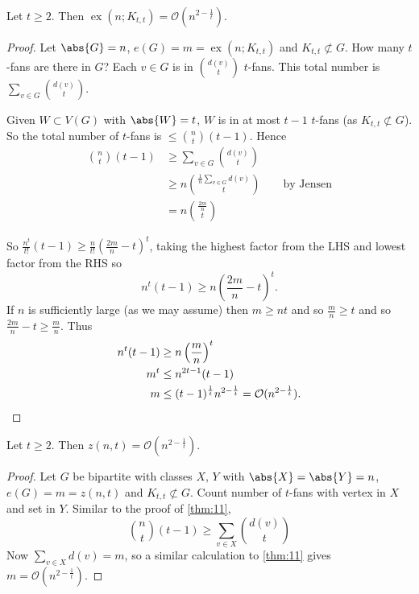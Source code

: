 \documentclass{article}
\DeclareMathOperator{\ext}{ex}
\begin{document}
\begin{nthm}\label{thm:11}
    Let $t \geq 2$.
    Then $\ext(n; K_{t,t}) = \mathcal{O}(n^{2 - \frac{1}{t}})$.
\end{nthm}
\begin{proof}
    Let $\abs{G} = n$, $e(G) = m = \ext(n; K_{t, t})$ and $K_{t,t} \not\subset G$.
    How many $t$-fans are there in $G$?
    Each $v \in G$ is in $\binom{d(v)}{t}$ $t$-fans.
    This total number is $\sum_{v \in G} \binom{d(v)}{t}$.

    Given $W \subset V(G)$ with $\abs{W} = t$, $W$ is in at most $t-1$ $t$-fans (as $K_{t, t} \not\subset G$).
    So the total number of $t$-fans is $\leq \binom{n}{t} (t-1)$.
    Hence
    \begin{align*}
        \binom{n}{t} (t-1) &\geq \sum_{v \in G} \binom{d(v)}{t} \\
                           &\geq n \binom{\frac{1}{n} \sum_{v \in G} d(v)}{t} \qquad \text{by Jensen}\\
                           &= n \binom{\frac{2m}{n}}{t}
    \end{align*}

    So $\frac{n^t}{t!} (t-1) \geq \frac{n}{t!} (\frac{2m}{n} - t)^t$, taking the highest factor from the LHS and lowest factor from the RHS so \begin{equation*}n^t (t-1) \geq n \left(\frac{2m}{n} - t\right)^t.\end{equation*}
    If $n$ is sufficiently large (as we may assume) then $m \geq n t$ and so $\frac{m}{n} \geq t$ and so $\frac{2m}{n} - t \geq \frac{m}{n}$.
    Thus
    \begin{align*}
        n^t (t-1) &\geq n \left(\frac{m}{n}\right)^t \\ m^t &\leq n^{2t-1} (t-1) \\
        m &\leq (t-1)^\frac{1}{t} n^{2-\frac{1}{t}} = \mathcal{O}(n^{2-\frac{1}{t}}). \qedhere
    \end{align*}
\end{proof}







\begin{nthm}\label{thm:12}
    Let $t \geq 2$. Then $z(n, t)  = \mathcal{O}(n^{2 - \frac{1}{t}})$.
\end{nthm}
\begin{proof}
    Let $G$ be bipartite with classes $X$, $Y$ with $\abs{X} = \abs{Y} = n$, $e(G) = m = z(n, t)$ and $K_{t, t} \not\subset G$.
    Count number of $t$-fans with vertex in $X$ and set in $Y$.
    Similar to the proof of \cref{thm:11},
    \begin{equation*}
        \binom{n}{t} (t-1) \geq \sum_{v \in X} \binom{d(v)}{t}
    \end{equation*}
    Now $\sum_{v \in X} d(v) = m$, so a similar calculation to \cref{thm:11} gives $m = \mathcal{O}(n^{2 - \frac{1}{t}})$.
\end{proof}
\end{document}
